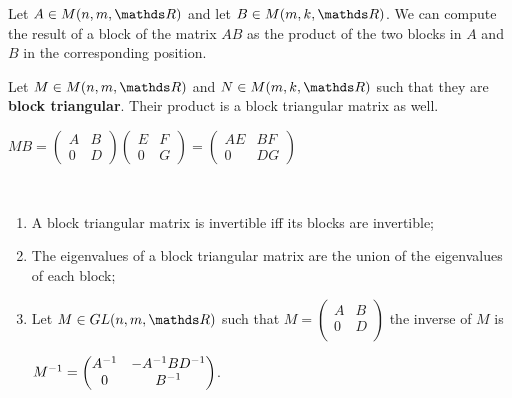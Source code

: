 \documentclass[computationalMathematics.tex]{subfiles}
\begin{document}
\begin{definition}
  Let $A \in M(n,m, \R)$ and let $B \in M(m, k, \R)$. We can compute the result of a block of the matrix $AB$ as the product of the two blocks in $A$ and $B$ in the corresponding position.
\end{definition}

\begin{proposition}
  Let $M \in M(n, m, \R)$ and $N \in M(m, k, \R)$ such that they are \textbf{block triangular}.
  Their product is a block triangular matrix as well.

  $M B 
  = \begin{pmatrix}
    A & B\\
    0 & D
  \end{pmatrix}
  \begin{pmatrix}
    E & F\\
    0 & G
  \end{pmatrix}
  = 
  \begin{pmatrix}
    AE & BF\\
    0 & DG
  \end{pmatrix}$
\end{proposition}

\begin{proposition}~\\
    \begin{enumerate}
      \item A block triangular matrix is invertible iff its blocks are invertible;
      \item The eigenvalues of a block triangular matrix are the union of the eigenvalues of each block;
      \item Let $M \in GL(n, m, \R)$ such that $M= 
        \begin{pmatrix}
          A & B\\
          0&D\\
        \end{pmatrix}$ 
       the inverse of $M$ is 
        
        ${M}^{-1} = 
        \begin{pmatrix}
          {A}^{-1} & -{A}^{-1}B{D}^{-1}\\
          0 & {B}^{-1}
        \end{pmatrix}$.
    \end{enumerate}
  \end{proposition}
\end{document}
